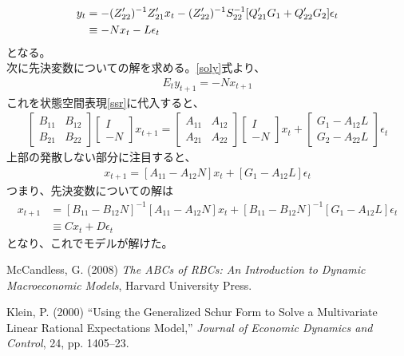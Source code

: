 \documentclass[a4j, dvipdfmx]{jarticle}
\begin{document}
\begin{align}
y_t &= -(Z^\prime_{22})^{-1}Z^\prime_{21}x_t - (Z^\prime_{22})^{-1}S_{22}^{-1}[Q^\prime_{21}G_{1}+Q^\prime_{22}G_2]\epsilon_t\notag\\
&\equiv -Nx_t - L\epsilon_t\label{soly}
\end{align}
となる。\\
次に先決変数についての解を求める。\eqref{soly}式より、
\begin{align}
E_ty_{t+1} = -Nx_{t+1}
\end{align}
これを状態空間表現\eqref{ssr}に代入すると、
\begin{align}
\begin{bmatrix}B_{11} & B_{12} \\ B_{21} & B_{22}\end{bmatrix}\begin{bmatrix}I \\ -N\end{bmatrix}x_{t+1} = \begin{bmatrix}A_{11} & A_{12} \\ A_{21} & A_{22}\end{bmatrix}\begin{bmatrix}I \\ -N\end{bmatrix}x_t + \begin{bmatrix}G_1- A_{12}L\\G_2-A_{22}L\end{bmatrix}\epsilon_t
\end{align}
上部の発散しない部分に注目すると、
\begin{align}
[B_{11} - B_{12}N]x_{t+1} = [A_{11} - A_{12}N]x_t + [G_1-A_{12}L]\epsilon_t
\end{align}
つまり、先決変数についての解は
\begin{align}
x_{t+1} &= [B_{11} - B_{12}N]^{-1}[A_{11} - A_{12}N]x_t + [B_{11} - B_{12}N]^{-1}[G_1-A_{12}L]\epsilon_t\\
&\equiv C x_t + D\epsilon_t
\end{align}
となり、これでモデルが解けた。

\begin{thebibliography}{xxx}
McCandless, G. (2008) {\it The ABCs of RBCs: An Introduction to Dynamic Macroeconomic Models}, Harvard University Press.

Klein, P. (2000) ``Using the Generalized Schur Form to Solve a Multivariate Linear Rational Expectations Model,'' {\it Journal of Economic Dynamics and Control}, 24, pp. 1405--23.

\end{thebibliography}
\end{document}
